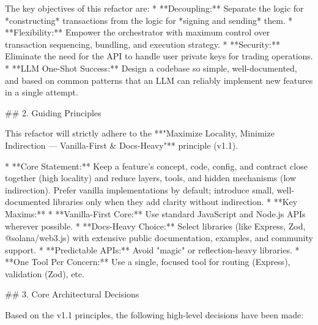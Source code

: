 The key objectives of this refactor are:
*   **Decoupling:** Separate the logic for *constructing* transactions from the logic for *signing and sending* them.
*   **Flexibility:** Empower the orchestrator with maximum control over transaction sequencing, bundling, and execution strategy.
*   **Security:** Eliminate the need for the API to handle user private keys for trading operations.
*   **LLM One-Shot Success:** Design a codebase so simple, well-documented, and based on common patterns that an LLM can reliably implement new features in a single attempt.

## 2. Guiding Principles

This refactor will strictly adhere to the **"Maximize Locality, Minimize Indirection — Vanilla-First & Docs-Heavy"** principle (v1.1).

*   **Core Statement:** Keep a feature’s concept, code, config, and contract close together (high locality) and reduce layers, tools, and hidden mechanisms (low indirection). Prefer vanilla implementations by default; introduce small, well-documented libraries only when they add clarity without indirection.
*   **Key Maxims:**
    *   **Vanilla-First Core:** Use standard JavaScript and Node.js APIs wherever possible.
    *   **Docs-Heavy Choice:** Select libraries (like Express, Zod, @solana/web3.js) with extensive public documentation, examples, and community support.
    *   **Predictable APIs:** Avoid "magic" or reflection-heavy libraries.
    *   **One Tool Per Concern:** Use a single, focused tool for routing (Express), validation (Zod), etc.

## 3. Core Architectural Decisions

Based on the v1.1 principles, the following high-level decisions have been made:

